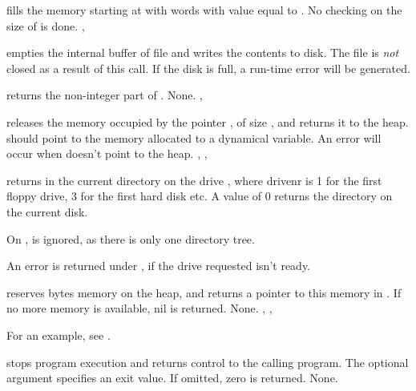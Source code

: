 \documentclass{report}
\begin{document}


{ fills the memory starting at  with  words
with value equal to .
}
{No checking on the size of  is done.}
{, }



{ empties the internal buffer of file  and writes the
contents to disk. The file is \textit{not} closed as a result of this call.}
{If the disk is full, a run-time error will be generated.}
{}



{ returns the non-integer part of .}
{None.}
{, }



{ releases the memory occupied by the pointer , of size
, and returns it to the heap.  should point to the memory
allocated to a dynamical variable.}
{An error will occur when  doesn't point to the heap.}
{, , }



{ returns in  the current directory on the drive
, where {drivenr} is 1 for the first floppy drive, 3 for the
first hard disk etc. A value of 0 returns the directory on the current disk.

On \linux,  is ignored, as there is only one directory tree.}
{An error is returned under \dos, if the drive requested isn't ready.}
{}



{ reserves  bytes memory on the heap, and returns a
pointer to this memory in . If no more memory is available, nil is
returned.}
{None.}
{, , }

For an example, see .

{ stops program execution and returns control to the calling
program. The optional argument  specifies an exit value. If
omitted, zero is returned.}
{None.}
{}
\end{document}
